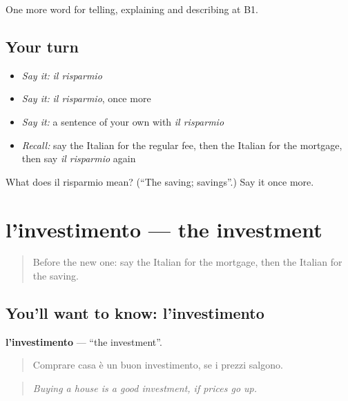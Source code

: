 \begin{grammarlens}[title={What you've built}]
One more word for telling, explaining and describing at B1.
\end{grammarlens}

\subsection*{Your turn}
\begin{itemize}
\raggedright
  \item \emph{Say it:} \emph{il risparmio}
  \item \emph{Say it:} \emph{il risparmio}, once more
  \item \emph{Say it:} a sentence of your own with \emph{il risparmio}
  \item \emph{Recall:} say the Italian for the regular fee, then the Italian for the mortgage, then say \emph{il risparmio} again
\end{itemize}

\begin{tcolorbox}[breakable,colback=teal!4,colframe=teal!35!black,title={Before you move on}]
What does il risparmio mean? (\textquotedblleft{}The saving; savings\textquotedblright{}.) Say it once more.
\end{tcolorbox}
\section[l'investimento]{l'investimento — the investment}

\label{lesson:IT-C395-investimento}



\begin{quote}
Before the new one: say the Italian for the mortgage, then the Italian for the saving.
\end{quote}

\subsection*{You'll want to know: l'investimento}
\textbf{l'investimento} — \textquotedblleft{}the investment\textquotedblright{}.

\begin{quote}
Comprare casa è un buon investimento, se i prezzi salgono.
\end{quote}

\begin{quote}
\emph{Buying a house is a good investment, if prices go up.}
\end{quote}

